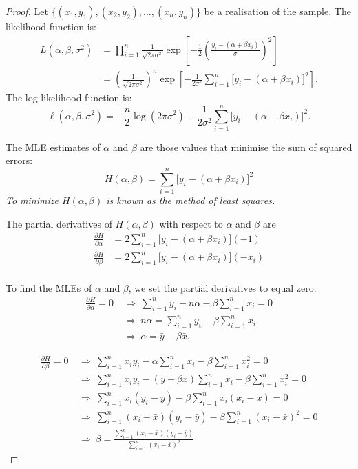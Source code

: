 \begin{proof}
Let $\{(x_1,y_1),(x_2,y_2),\ldots,(x_n,y_n)\}$ be a realisation of the sample. The likelihood function is:
\begin{align*}
L(\alpha,\beta,\sigma^2)
	& = \prod_{i=1}^n \frac{1}{\sqrt{2\pi\sigma^2}}\exp\left[-\frac{1}{2}\left(\frac{y_i-(\alpha+\beta x_i)}{\sigma}\right)^2\right] \\
	& = \left(\frac{1}{\sqrt{2\pi\sigma^2}}\right)^n \exp\left[-\frac{1}{2\sigma^2}\sum_{i=1}^n \big[y_i-(\alpha+\beta x_i)\big]^2\right].
\end{align*}
The log-likelihood function is:
\[
\ell(\alpha,\beta,\sigma^2)
	= - \frac{n}{2}\log(2\pi\sigma^2) - \frac{1}{2\sigma^2}\sum_{i=1}^n \big[y_i-(\alpha+\beta x_i)\big]^2.
\]

The MLE estimates of $\alpha$ and $\beta$ are those values that minimise the sum of squared errors:
\[
H(\alpha,\beta) = \sum_{i=1}^n \big[y_i-(\alpha+\beta x_i)\big]^2
\]
\bit
\it To minimize $H(\alpha,\beta)$ is known as the \emph{method of least squares}.
\eit

The partial derivatives of $H(\alpha,\beta)$ with respect to $\alpha$ and $\beta$ are
\begin{align*}
\frac{\partial H}{\partial\alpha} 
	& = 2\sum_{i=1}^n \big[y_i-(\alpha+\beta x_i)\big] (-1) \\
\frac{\partial H}{\partial\beta} 
	& = 2\sum_{i=1}^n \big[y_i-(\alpha+\beta x_i)\big] (-x_i) \\
\end{align*}

To find the MLEs of $\alpha$ and $\beta$, we set the partial derivatives to equal zero.
\begin{align*}
\frac{\partial H}{\partial\alpha} = 0
	& \ \Rightarrow\  \sum_{i=1}^n y_i- n\alpha -\beta\sum_{i=1}^n x_i = 0 \\
	& \ \Rightarrow\  n\alpha  = \sum_{i=1}^n y_i- \beta\sum_{i=1}^n x_i \\
	& \ \Rightarrow\  \alpha = \bar{y}-\beta\bar{x}.
\end{align*}

\begin{align*}
\frac{\partial H}{\partial\beta} =0
	& \ \Rightarrow\  \sum_{i=1}^n x_i y_i - \alpha\sum_{i=1}^n x_i -\beta\sum_{i=1}^n x_i^2 = 0 \\
	& \ \Rightarrow\  \sum_{i=1}^n x_i y_i - (\bar{y}-\beta\bar{x})\sum_{i=1}^n x_i -\beta\sum_{i=1}^n x_i^2 = 0 \\
	& \ \Rightarrow\  \sum_{i=1}^n x_i(y_i-\bar{y}) - \beta\sum_{i=1}^n x_i(x_i-\bar{x}) = 0 \\
	& \ \Rightarrow\  \sum_{i=1}^n (x_i-\bar{x})(y_i-\bar{y}) - \beta\sum_{i=1}^n (x_i-\bar{x})^2 = 0 \\
	& \ \Rightarrow\  \beta = \frac{\sum_{i=1}^n (x_i-\bar{x})(y_i-\bar{y})}{\sum_{i=1}^n (x_i-\bar{x})^2}
\end{align*}


\end{proof}
